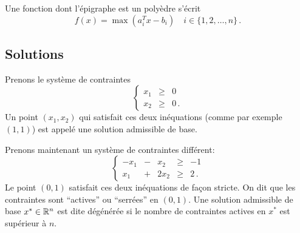 	Une fonction dont l'épigraphe est un polyèdre s'écrit
	\[
	f(x) = \max \left( a_i^T x - b_i \right)
	\quad i \in \{1,2,\dots,n\}\,.
	\]

\subsection{Solutions}

	Prenons le système de contraintes
	\[
	\renewcommand{\arraystretch}{1.5}
	\left\{
	\begin{array}{rcl}
		x_1 & \ge & 0\\
		x_2 & \ge & 0\,.
	\end{array}
	\right.
	\]
	Un point $(x_1,x_2)$ qui satisfait ces deux inéquations
	(comme par exemple $(1,1)$)
	est appelé une solution admissible de base.

	Prenons maintenant un système de contraintes différent:
	\[
	\renewcommand{\arraystretch}{1.5}
	\left\{
	\begin{array}{rcrcr}
		-x_1 & - & x_2  & \ge & -1\\
		 x_1 & + & 2x_2 & \ge &  2\,.
	\end{array}
	\right.
	\]
	Le point $(0,1)$ satisfait ces deux inéquations
	de façon stricte.
	On dit que les contraintes sont ``actives'' ou ``serrées'' en $(0,1)$.
	Une solution admissible de base $x^* \in \mathbb{R}^n$ est dite dégénérée
	si le nombre de contraintes actives
	en $x^*$ est supérieur à $n$.

	\begin{center}
	\end{center}

